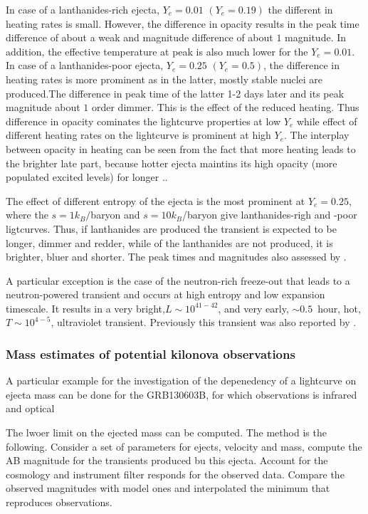 \documentclass[11pt,a4paper,headinclude=true,DIV=14,BCOR=8mm,chapterprefix,listof=totoc,twoside,openright,abstracton]{scrbook}
\begin{document}
In case of a lanthanides-rich ejecta, $Y_e=0.01$ $(Y_e=0.19)$ the different in heating rates is small. However, the difference in opacity results in the peak time difference of about a weak and magnitude difference of about $1$ magnitude. In addition, the effective temperature at peak is also much lower for the $Y_e=0.01$. 
In case of a lanthanides-poor ejecta, $Y_e=0.25$ $(Y_e=0.5)$, the difference in heating rates is more prominent as in the latter, mostly stable nuclei are produced.The difference in peak time of the latter 1-2 days later and its peak magnitude about $1$ order dimmer. This is the effect of the reduced heating.
Thus difference in opacity cominates the lightcurve properties at low $Y_e$ while effect of different heating rates on the lightcurve is prominent at high $Y_e$. 
The interplay between opacity in heating can be seen from the fact that more heating leads to the brighter late part, because hotter ejecta maintins its high opacity (more populated excited levels) for longer \cite{Kasen et al., 2013}.. 

The effect of different entropy of the ejecta is the most prominent at $Y_e=0.25$, where the $s=1k_B/$baryon and $s=10k_B$/baryon give lanthanides-righ and -poor ligtcurves.
Thus, if lanthanides are produced the transient is expected to be longer, dimmer and redder, while of the lanthanides are not produced, it is brighter, bluer and shorter.
The peak times and magnitudes also assessed by \cite{e.g. Roberts et al., 2011; Barnes and Kasen, 2013; Tanaka and Hotokezaka, 2013}. 

A particular exception is the case of the neutron-rich freeze-out that leads to a neutron-powered transient and occurs at high entropy and low expansion timescale. It results in a very bright,$L\sim10^{41-42}$, and very early, $\sim0.5$~hour, hot, $T\sim 10^{4-5}$, ultraviolet transient. Previously this transient was also reported by \cite{Metzger et al. (2015)}.


\subsubsection{Mass estimates of potential kilonova observations}

A particular example for the investigation of the depenedency of a lightcurve on ejecta mass can be done for the GRB130603B, for which observations is infrared and optical \cite{Berger et al., 2013; Tanvir et al., 2013}

The lwoer limit on the ejected mass can be computed. The method is the following. Consider a set of parameters for ejects, velocity and mass, compute the AB magnitude for the transients produced bu this ejecta. Account for the cosmology and instrument filter responds for the observed data. Compare the observed magnitudes with model ones and interpolated the minimum that reproduces observations.
\end{document}
